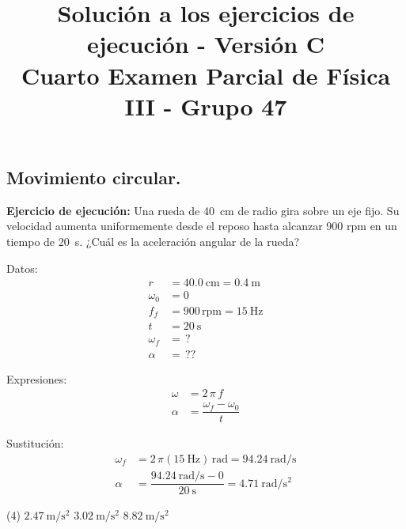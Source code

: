 \documentclass[12pt, letter]{exam}
\date{}
\title{Solución a los ejercicios de ejecución - Versión C \\ Cuarto Examen Parcial de Física III  - Grupo 47}
\begin{document}
\maketitle

\setcounter{page}{2}

\begin{questions}
    \section{Movimiento circular.}

    \setcounter{question}{4} \question \label{Ejercicio_02} \textbf{Ejercicio de ejecución: }  Una rueda de \SI{40}{\centi\meter} de radio gira sobre un eje fijo. Su velocidad aumenta uniformemente desde el reposo hasta  alcanzar \num{900} rpm en un tiempo de \SI{20}{\second}. ¿Cuál es la aceleración angular de la rueda?

    \begin{minipage}[t]{0.4\linewidth}
    Datos: 
    \begin{align*}
    r &= \SI{40.0}{\centi\meter} = \SI{0.4}{\meter} \\
    \omega_{0} &= 0 \\
    f_{f} &= 900 \, \text{rpm} = \SI{15}{\hertz} \\
    t &= \SI{20}{\second} \\
    \omega_{f} &= \, ? \\
    \alpha &= \, ??
    \end{align*}
    \end{minipage}
    \hspace{1cm}
    \begin{minipage}[t]{0.4\linewidth}
    Expresiones:
    \begin{align*}
    \omega &= 2 \, \pi \, f \\
    \alpha &= \dfrac{\omega_{f} - \omega_{0}}{t}
    \end{align*}
    \end{minipage}

    Sustitución:
    \begin{align*}
    \omega_{f} &= 2 \, \pi (\SI{15}{\hertz}) \, \unit{\radian} = \SI[per-mode=fraction]{94.24}{\radian\per\second} \\
    \alpha &= \dfrac{ \displaystyle \SI[per-mode=fraction]{94.24}{\radian\per\second} - 0 }{\SI{20}{\second}} = \SI[per-mode=fraction]{4.71}{\radian\per\square\second}
    \end{align*}

    \vspace{0.3cm}
    \begin{tasks}(4)
        \task $\displaystyle \SI[per-mode=fraction]{2.47}{\meter\per\square\second}$
        \task $\displaystyle \SI[per-mode=fraction]{3.02}{\meter\per\square\second}$
        \task {}
        \task $\displaystyle \SI[per-mode=fraction]{8.82}{\meter\per\square\second}$
    \end{tasks}


\end{questions}
\end{document}
